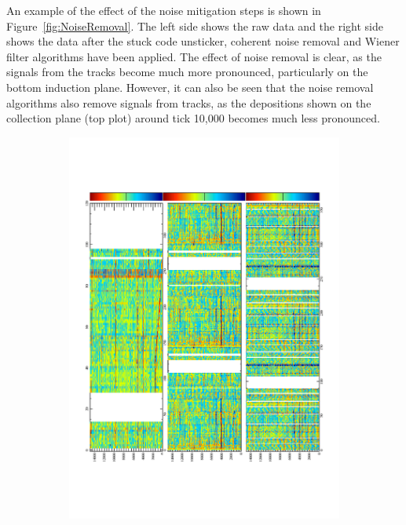 An example of the effect of the noise mitigation steps is shown in Figure~\ref{fig:NoiseRemoval}. The left side shows the raw data and the right side shows the data after the stuck code unsticker, coherent noise removal and Wiener filter algorithms have been applied. The effect of noise removal is clear, as the signals from the tracks become much more pronounced, particularly on the bottom induction plane. However, it can also be seen that the noise removal algorithms also remove signals from tracks, as the depositions shown on the collection plane (top plot) around tick 10,000 becomes much less pronounced. \\

\begin{figure}
  \centering
  \begin{subfigure}{0.55\textwidth}
    \centering
    \includegraphics[width=\textwidth]{Evd_BeforeNoise}

\end{subfigure}
\end{figure}
